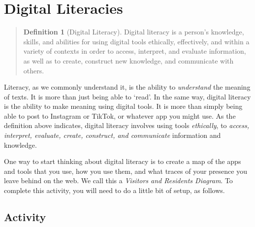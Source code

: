 \documentclass[
]{book}
\theoremstyle{definition}
\newtheorem{definition}{Definition}[chapter]
\theoremstyle{definition}
\theoremstyle{definition}
\theoremstyle{definition}
\theoremstyle{remark}
\begin{document}
\hypertarget{digital-literacies}{%
\section{Digital Literacies}\label{digital-literacies}}

\begin{quote}
\begin{definition}[Digital Literacy]
\protect\hypertarget{def:diglit}{}\label{def:diglit}Digital literacy is a person's knowledge, skills, and abilities for using digital tools ethically, effectively, and within a variety of contexts in order to access, interpret, and evaluate information, as well as to create, construct new knowledge, and communicate with others. \citep{digitallearningadvisorycommitteePostSecondaryDigitalLearning2022}
\end{definition}
\end{quote}

Literacy, as we commonly understand it, is the ability to \emph{understand} the meaning of texts. It is more than just being able to `read'. In the same way, digital literacy is the ability to make meaning using digital tools. It is more than simply being able to post to Instagram or TikTok, or whatever app you might use. As the definition above indicates, digital literacy involves using tools \emph{ethically}, to \emph{access, interpret, evaluate, create, construct, and communicate} information and knowledge.

One way to start thinking about digital literacy is to create a map of the apps and tools that you use, how you use them, and what traces of your presence you leave behind on the web. We call this a \emph{Visitors and Residents Diagram}. To complete this activity, you will need to do a little bit of setup, as follows.

\hypertarget{activity-1}{%
\subsection*{Activity}\label{activity-1}}
\end{document}

